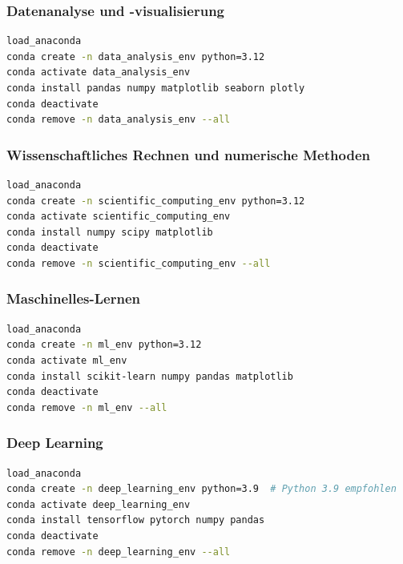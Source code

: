 \documentclass{vorlage-design-main}
\begin{document}
\subsubsection{Datenanalyse und
-visualisierung}\label{datenanalyse-und--visualisierung}

\begin{lstlisting}[language=bash]
load_anaconda
conda create -n data_analysis_env python=3.12
conda activate data_analysis_env
conda install pandas numpy matplotlib seaborn plotly
conda deactivate
conda remove -n data_analysis_env --all
\end{lstlisting}

\subsubsection{Wissenschaftliches Rechnen und numerische
Methoden}\label{wissenschaftliches-rechnen-und-numerische-methoden}

\begin{lstlisting}[language=bash]
load_anaconda
conda create -n scientific_computing_env python=3.12
conda activate scientific_computing_env
conda install numpy scipy matplotlib
conda deactivate
conda remove -n scientific_computing_env --all
\end{lstlisting}

\subsubsection{Maschinelles-Lernen}\label{maschinelles-lernen-1}

\begin{lstlisting}[language=bash]
load_anaconda
conda create -n ml_env python=3.12
conda activate ml_env
conda install scikit-learn numpy pandas matplotlib
conda deactivate
conda remove -n ml_env --all
\end{lstlisting}

\subsubsection{Deep Learning}\label{deep-learning}

\begin{lstlisting}[language=bash]
load_anaconda
conda create -n deep_learning_env python=3.9  # Python 3.9 empfohlen
conda activate deep_learning_env
conda install tensorflow pytorch numpy pandas
conda deactivate
conda remove -n deep_learning_env --all
\end{lstlisting}
\end{document}
